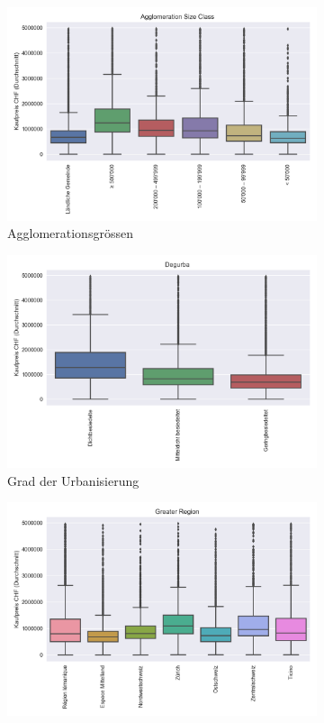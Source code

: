\begin{figure}[h]
\begin{subfigure}{.5\textwidth}
  \centering
  \includegraphics[width=\linewidth]{images/anhang/analysis/boxplot_agglomeration_size_class_id.png}
  \caption{Agglomerationsgrössen}
\end{subfigure}
\begin{subfigure}{.5\textwidth}
  \centering
  \includegraphics[width=\linewidth]{images/anhang/analysis/boxplot_degurba_id.png}
  \caption{Grad der Urbanisierung} 
\end{subfigure}
\begin{subfigure}{.5\textwidth}
  \centering
  \includegraphics[width=\linewidth]{images/anhang/analysis/boxplot_greater_region_id.png}

\end{subfigure}
\end{figure}
